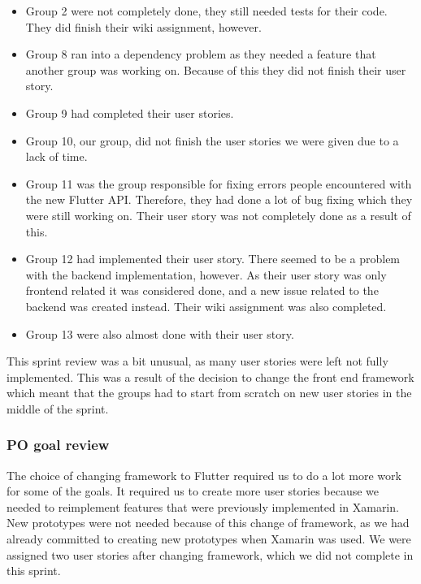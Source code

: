 \begin{itemize}
    \item Group 2 were not completely done, they still needed tests for their code. They did finish their wiki assignment, however.
    \item Group 8 ran into a dependency problem as they needed a feature that another group was working on. Because of this they did not finish their user story.
    \item Group 9 had completed their user stories.
    \item Group 10, our group, did not finish the user stories we were given due to a lack of time.
    \item Group 11 was the group responsible for fixing errors people encountered with the new Flutter API. Therefore, they had done a lot of bug fixing which they were still working on. Their user story was not completely done as a result of this.
    \item Group 12 had implemented their user story. There seemed to be a problem with the backend implementation, however. As their user story was only frontend related it was considered done, and a new issue related to the backend was created instead. Their wiki assignment was also completed.
    \item Group 13 were also almost done with their user story.
\end{itemize}
\noindent
This sprint review was a bit unusual, as many user stories were left not fully implemented. This was a result of the decision to change the front end framework which meant that the groups had to start from scratch on new user stories in the middle of the sprint.

\subsubsection{PO goal review} 
The choice of changing framework to Flutter required us to do a lot more work for some of the goals.
It required us to create more user stories because we needed to reimplement features that were previously implemented in Xamarin.
New prototypes were not needed because of this change of framework, as we had already committed to creating new prototypes when Xamarin was used.
We were assigned two user stories after changing framework, which we did not complete in this sprint.

